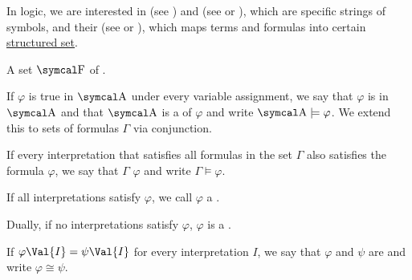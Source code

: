 \begin{definition}\label{def:logic_syntax}
  In logic, we are interested in  (see ) and  (see  or ), which are specific strings of symbols, and their  (see  or ), which maps terms and formulas into certain \hyperref[def:concrete_category]{structured set}.
\end{definition}

\begin{definition}\label{remark:syntax_and_semantics}


  A set \( \CF \) of . 


  \begin{RemEnum}
     If \( \varphi \) is true in \( \CA \) under every variable assignment, we say that \( \varphi \) is  in \( \CA \) and that \( \CA \) is a  of \( \varphi \) and write \( \CA \models \varphi \). We extend this to sets of formulas \( \Gamma \) via conjunction.

     If every interpretation that satisfies all formulas in the set \( \Gamma \) also satisfies the formula \( \varphi \), we say that \( \Gamma \)  \( \varphi \) and write \( \Gamma \models \varphi \).

     If all interpretations satisfy \( \varphi \), we call \( \varphi \) a .

     Dually, if no interpretations satisfy \( \varphi \), \( \varphi \) is a .

     If \( \varphi\Val{I} = \psi\Val{I} \) for every interpretation \( I \), we say that \( \varphi \) and \( \psi \) are  and write \( \varphi \cong \psi \).
  \end{RemEnum}
\end{definition}
